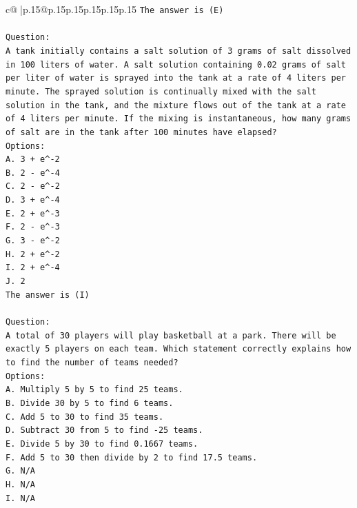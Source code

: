 \documentclass{article}
\begin{document}
{\begin{supertabular}{c@{$\;$}|p{.15\linewidth}@{}p{.15\linewidth}p{.15\linewidth}p{.15\linewidth}p{.15\linewidth}p{.15\linewidth}}
{{{\texttt{The answer is (E)} \\
\\ 
\texttt{Question:} \\
\texttt{A tank initially contains a salt solution of 3 grams of salt dissolved in 100 liters of water. A salt solution containing 0.02 grams of salt per liter of water is sprayed into the tank at a rate of 4 liters per minute. The sprayed solution is continually mixed with the salt solution in the tank, and the mixture flows out of the tank at a rate of 4 liters per minute. If the mixing is instantaneous, how many grams of salt are in the tank after 100 minutes have elapsed?} \\
\texttt{Options:} \\
\texttt{A. 3 + e\^{}{-}2} \\
\texttt{B. 2 {-} e\^{}{-}4} \\
\texttt{C. 2 {-} e\^{}{-}2} \\
\texttt{D. 3 + e\^{}{-}4} \\
\texttt{E. 2 + e\^{}{-}3} \\
\texttt{F. 2 {-} e\^{}{-}3} \\
\texttt{G. 3 {-} e\^{}{-}2} \\
\texttt{H. 2 + e\^{}{-}2} \\
\texttt{I. 2 + e\^{}{-}4} \\
\texttt{J. 2} \\
\texttt{The answer is (I)} \\
\\ 
\texttt{Question:} \\
\texttt{A total of 30 players will play basketball at a park. There will be exactly 5 players on each team. Which statement correctly explains how to find the number of teams needed?} \\
\texttt{Options:} \\
\texttt{A. Multiply 5 by 5 to find 25 teams.} \\
\texttt{B. Divide 30 by 5 to find 6 teams.} \\
\texttt{C. Add 5 to 30 to find 35 teams.} \\
\texttt{D. Subtract 30 from 5 to find {-}25 teams.} \\
\texttt{E. Divide 5 by 30 to find 0.1667 teams.} \\
\texttt{F. Add 5 to 30 then divide by 2 to find 17.5 teams.} \\
\texttt{G. N/A} \\
\texttt{H. N/A} \\
\texttt{I. N/A} \\
}}}
\end{supertabular}}
\end{document}
